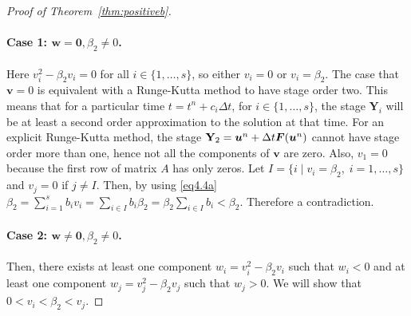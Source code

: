 \begin{proof}[Proof of Theorem~\ref{thm:positiveb}]
\paragraph{Case 1: \( \bm{w} = \bm{0}, \beta_2 \neq 0 \).}

Here \( v_{i}^{2} - \beta_{2}v_{i} = 0 \) for all \( i \in \{1,\dots,s\} \), so either \( v_{i} = 0 \) or \( v_{i} = \beta_{2} \).
The case that \( \bm{v} = 0 \) is equivalent with a Runge-Kutta method to have stage order two. This means that for a particular time \( t = t^{n} + c_{i}\Delta t \), for \( i \in \{1, \dots, s\} \), the stage \( \textbf{Y}_{i} \) will be at least a second order approximation to the solution at that time.
For an explicit Runge-Kutta method, the stage \( \textbf{Y}_{2} = \bm{u}^{n} + \Delta t\bm{F}(\bm{u}^{n}) \) cannot have stage order more than one, hence not all the components of \( \bm{v} \) are zero. Also, \( v_{1} = 0 \) because the first row of matrix \( A \) has only zeros. Let \( I = \{ i \;|\; v_{i} = \beta_{2}, \; i = 1,\dots,s \} \) and \( v_{j} = 0 \) if \( j \neq I \). Then, by using \eqref{eq4.4a} \( \beta_{2} = \sum_{i=1}^{s}b_{i}v_{i} = \sum_{i \in I}b_{i}\beta_{2} = \beta_{2}\sum_{i \in I}b_{i} < \beta_{2} \). Therefore a contradiction.


\paragraph{Case 2: \( \bm{w} \neq \bm{0}, \beta_2 \neq 0 \).}

    Then, there exists at least one component \( w_{i} = v_{i}^{2} - \beta_{2}v_{i} \) such that \( w_{i} < 0 \) and at least one component \( w_{j} = v_{j}^{2} - \beta_{2}v_{j} \) such that \( w_{j} > 0 \). We will show that \( 0 < v_{i} < \beta_{2} < v_{j} \).


\end{proof}

